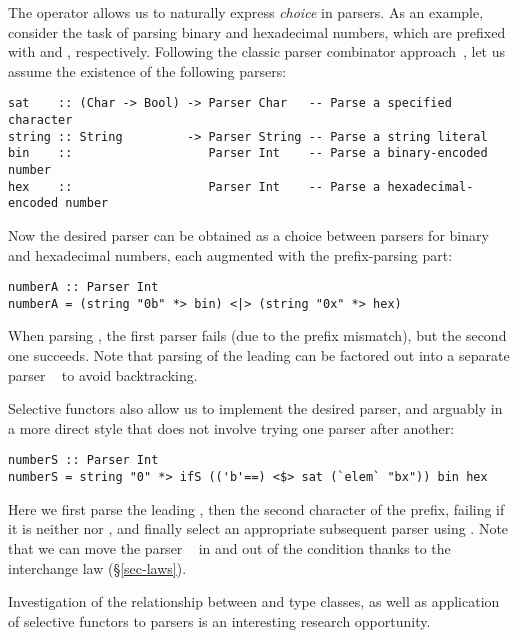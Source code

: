 \noindent
The operator \hs{<|>} allows us to naturally express \emph{choice} in parsers.
As an example, consider the task of parsing binary and hexadecimal numbers,
which are prefixed with  and , respectively. Following the
classic parser combinator approach~\citep{hutton1998monadic}, let us assume the
existence of the following parsers:

\vspace{1mm}
\begin{verbatim}
sat    :: (Char -> Bool) -> Parser Char   -- Parse a specified character
string :: String         -> Parser String -- Parse a string literal
bin    ::                   Parser Int    -- Parse a binary-encoded number
hex    ::                   Parser Int    -- Parse a hexadecimal-encoded number
\end{verbatim}
\vspace{1mm}

\noindent
Now the desired parser can be obtained as a choice between parsers for binary
and hexadecimal numbers, each augmented with the prefix-parsing part:

\vspace{1mm}
\begin{verbatim}
numberA :: Parser Int
numberA = (string "0b" *> bin) <|> (string "0x" *> hex)
\end{verbatim}
\vspace{1mm}

\noindent
When parsing , the first parser fails (due to the prefix mismatch),
but the second one succeeds. Note that parsing of the leading  can be
factored out into a separate parser ~ to avoid backtracking.

Selective functors also allow us to implement the desired parser, and arguably
in a more direct style that does not involve trying one parser after another:

\vspace{1mm}
\begin{verbatim}
numberS :: Parser Int
numberS = string "0" *> ifS (('b'==) <$> sat (`elem` "bx")) bin hex
\end{verbatim}
\vspace{1mm}

\noindent
Here we first parse the leading , then the second character of the
prefix, failing if it is neither  nor , and finally select an
appropriate subsequent parser using . Note that we can move the parser
~ in and out of the condition  thanks to the
interchange law (\S\ref{sec-laws}).

Investigation of the relationship between  and 
type classes, as well as application of selective functors to parsers is an
interesting research opportunity.
